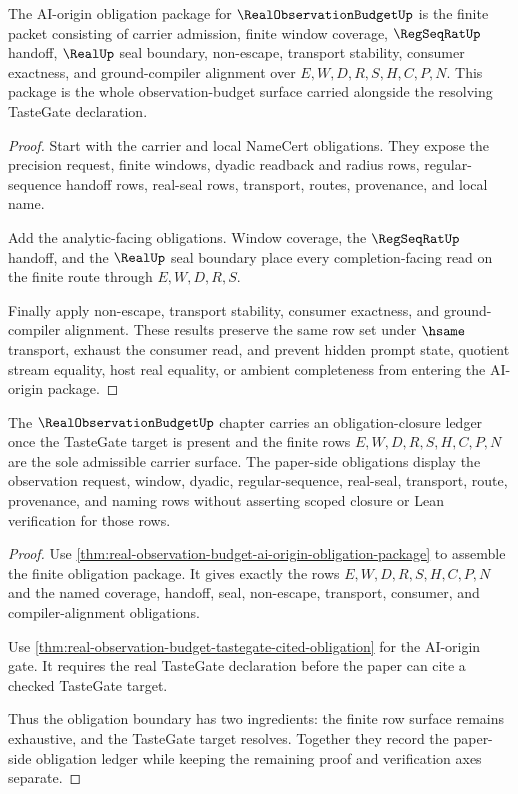 \begin{theorem}
\label{thm:real-observation-budget-ai-origin-obligation-package}
The AI-origin obligation package for $\RealObservationBudgetUp$ is the finite packet consisting of carrier admission, finite window coverage, $\RegSeqRatUp$ handoff, $\RealUp$ seal boundary, non-escape, transport stability, consumer exactness, and ground-compiler alignment over $E,W,D,R,S,H,C,P,N$. This package is the whole observation-budget surface carried alongside the resolving TasteGate declaration.
\end{theorem}
\begin{proof}
Start with the carrier and local NameCert obligations. They expose the precision request, finite windows, dyadic readback and radius rows, regular-sequence handoff rows, real-seal rows, transport, routes, provenance, and local name.

Add the analytic-facing obligations. Window coverage, the $\RegSeqRatUp$ handoff, and the $\RealUp$ seal boundary place every completion-facing read on the finite route through $E,W,D,R,S$.

Finally apply non-escape, transport stability, consumer exactness, and ground-compiler alignment. These results preserve the same row set under $\hsame$ transport, exhaust the consumer read, and prevent hidden prompt state, quotient stream equality, host real equality, or ambient completeness from entering the AI-origin package.
\end{proof}

\begin{theorem}
\label{thm:real-observation-budget-seed-to-obligation-readiness}
The $\RealObservationBudgetUp$ chapter carries an obligation-closure ledger once the TasteGate target is present and the finite rows $E,W,D,R,S,H,C,P,N$ are the sole admissible carrier surface. The paper-side obligations display the observation request, window, dyadic, regular-sequence, real-seal, transport, route, provenance, and naming rows without asserting scoped closure or Lean verification for those rows.
\end{theorem}
\begin{proof}
Use \autoref{thm:real-observation-budget-ai-origin-obligation-package} to assemble the finite obligation package. It gives exactly the rows $E,W,D,R,S,H,C,P,N$ and the named coverage, handoff, seal, non-escape, transport, consumer, and compiler-alignment obligations.

Use \autoref{thm:real-observation-budget-tastegate-cited-obligation} for the AI-origin gate. It requires the real TasteGate declaration before the paper can cite a checked TasteGate target.

Thus the obligation boundary has two ingredients: the finite row surface remains exhaustive, and the TasteGate target resolves. Together they record the paper-side obligation ledger while keeping the remaining proof and verification axes separate.
\end{proof}

